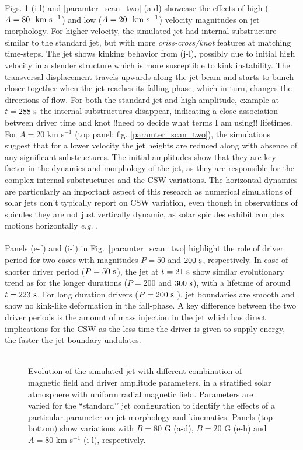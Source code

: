 \documentclass[12pt]{ociamthesis}
\newcommand{\fref}[1]{fig. \ref{#1}}
\newcommand{\kms}{~\rm{km ~s^{-1}}}
\newcommand{\np}{\\ \\}
\begin{document}
Figs. \ref{paramter_scan_one} (i-l) and \ref{paramter_scan_two} (a-d) showcase the effects of high ($A = 80 ~\kms$) and low ($A = 20 ~\kms$) velocity magnitudes on jet morphology. For higher velocity, the simulated jet had internal substructure similar to the standard jet, but with more \textit{criss-cross/knot} features at matching time-steps. The jet shows kinking behavior from (j-l), possibly due to initial high velocity in a slender structure which is more susceptible to kink instability. The transversal displacement travels upwards along the jet beam and starts to bunch closer together when the jet reaches its falling phase, which in turn, changes the directions of flow. For both the standard jet and high amplitude, example at $t = 288 ~\rm{s}$ the internal substructures disappear, indicating a close association between driver time and knot {\color{green}!!need to decide what terms I am using!!} lifetimes. For $A = 20$ km s$^{-1}$ (top panel: \fref{paramter_scan_two}), the simulations suggest that for a lower velocity the jet heights are reduced along with absence of any significant substructures. The initial amplitudes show that they are key factor in the dynamics and morphology of the jet, as they are responsible for the complex internal substructures and the CSW variations. The horizontal dynamics are particularly an important aspect of this research as numerical simulations of solar jets don't typically report on CSW variation, even though in observations of spicules they are not just vertically dynamic, as solar spicules exhibit complex motions horizontally \textit{e.g.} \citep{Sharma2018ApJ85361S,Antolin2018ApJ85644A}. \np
%
Panels (e-f) and (i-l) in Fig.~\ref{paramter_scan_two} highlight the role of driver period for two cases with magnitudes $P = 50$ and $200~\rm{s}$, respectively. In case of shorter driver period ($P = 50 ~\rm{s}$), the jet at $t = 21~\rm{s}$ show similar evolutionary trend as for the longer durations ($P = 200$ and $300~\rm{s}$), with a lifetime of around $t = 223~\rm{s}$. For long duration drivers ($P = 200~\rm{s}$ ), jet boundaries are smooth and show no kink-like deformation in the fall-phase. A key difference between the two driver periods is the amount of mass injection in the jet which has direct implications for the CSW as the less time the driver is given to supply energy, the faster the jet boundary undulates. \np
\begin{figure}
\captionsetup[subfigure]{labelformat=empty}
\centering
{} 
\caption{Evolution of the simulated jet with different combination of magnetic field and driver amplitude parameters, in a stratified solar atmosphere with uniform radial magnetic field. Parameters are varied for the ``standard’’ jet configuration to identify the effects of a particular parameter on jet morphology and kinematics. Panels (top-bottom) show variations with $B = 80$ G (a-d), $B = 20$ G  (e-h) and $A = 80$ km s$^{-1}$ (i-l), respectively.}
\label{paramter_scan_one}
\end{figure}
\end{document}
